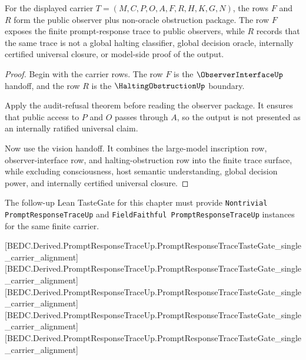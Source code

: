 \begin{theorem}
\label{thm:prompt-response-trace-observer-obstruction-package}
For the displayed carrier $T=(M,C,P,O,A,F,R,H,K,G,N)$, the rows $F$ and $R$ form the public observer plus non-oracle obstruction package. The row $F$ exposes the finite prompt-response trace to public observers, while $R$ records that the same trace is not a global halting classifier, global decision oracle, internally certified universal closure, or model-side proof of the output.
\end{theorem}
\begin{proof}
Begin with the carrier rows. The row $F$ is the $\ObserverInterfaceUp$ handoff, and the row $R$ is the $\HaltingObstructionUp$ boundary.

Apply the audit-refusal theorem before reading the observer package. It ensures that public access to $P$ and $O$ passes through $A$, so the output is not presented as an internally ratified universal claim.

Now use the vision handoff. It combines the large-model inscription row, observer-interface row, and halting-obstruction row into the finite trace surface, while excluding consciousness, host semantic understanding, global decision power, and internally certified universal closure.
\end{proof}



The follow-up Lean TasteGate for this chapter must provide \texttt{Nontrivial PromptResponseTraceUp} and \texttt{FieldFaithful PromptResponseTraceUp} instances for the same finite carrier.

[BEDC.Derived.PromptResponseTraceUp.PromptResponseTraceTasteGate\_single\_carrier\_alignment]
[BEDC.Derived.PromptResponseTraceUp.PromptResponseTraceTasteGate\_single\_carrier\_alignment]
[BEDC.Derived.PromptResponseTraceUp.PromptResponseTraceTasteGate\_single\_carrier\_alignment]
[BEDC.Derived.PromptResponseTraceUp.PromptResponseTraceTasteGate\_single\_carrier\_alignment]
[BEDC.Derived.PromptResponseTraceUp.PromptResponseTraceTasteGate\_single\_carrier\_alignment]

